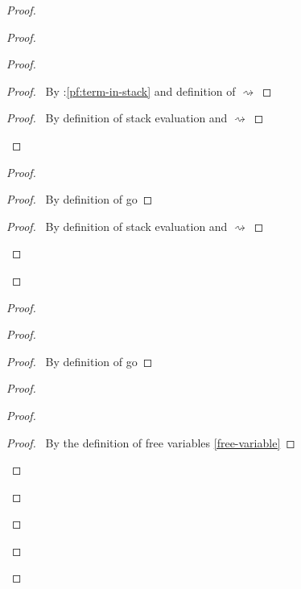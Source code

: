 \documentclass[a4paper]{article}
\begin{document}
\begin{proof}
\begin{proof}
\begin{proof}
      \begin{proof}
        \pf\ By \toplevel:\ref{pf:term-in-stack} and definition of $\rightsquigarrow$
      \end{proof}
      \begin{proof}
        \pf\ By definition of stack evaluation and $\rightsquigarrow$
      \end{proof}
    \end{proof}
    \begin{proof}
      \begin{proof}
        \pf\ By definition of \textsf{go}
      \end{proof}
      \begin{proof}
        \pf\ By definition of stack evaluation and $\rightsquigarrow$
      \end{proof}
    \end{proof}
  \end{proof}
  \begin{proof}
    \begin{proof}
      \begin{proof}
        \pf\ By definition of \textsf{go}
      \end{proof}
      \begin{proof}
        \begin{proof}
          \begin{proof}
            \pf\ By the definition of free variables \ref{free-variable}
          \end{proof}

\end{proof}
\end{proof}
\end{proof}
\end{proof}
\end{proof}
\end{document}
